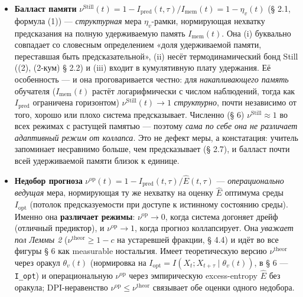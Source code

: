 \documentclass[pdflatex,sn-mathphys-ay]{sn-jnl}
\begin{document}
\begin{itemize}

\item

  \textbf{Балласт памяти} \(\nu^{\text{Still}}(t) = 1 - I_{\text{pred}}(t,\tau)/I_{\text{mem}}(t) = 1 - \eta_v(t)\) (§ 2.1, формула (1)) --- \emph{структурная} мера \(\eta_v\)-рамки, нормирующая нехватку предсказания на полную удерживаемую память \(I_{\text{mem}}(t)\). Она (i) буквально совпадает со словесным определением «доля удерживаемой памяти, переставшая быть предсказательной», (ii) несёт термодинамический бонд Still ((2), (2-кум) § 2.2) и (iii) входит в кумулятивную плату удержания. Её особенность --- и она проговаривается честно: для \emph{накапливающего память} обучателя (\(I_{\text{mem}}(t)\) растёт логарифмически с числом наблюдений, тогда как \(I_{\text{pred}}\) ограничена горизонтом) \(\nu^{\text{Still}}(t) \to 1\) \emph{структурно}, почти независимо от того, хорошо или плохо система предсказывает. Численно (§ 6) \(\nu^{\text{Still}} \approx 1\) во всех режимах с растущей памятью --- поэтому \emph{сама по себе она не различает адаптивный режим от коллапса}. Это не дефект меры, а констатация: учитель запоминает несравнимо больше, чем предсказывает (§ 2.7), и балласт почти всей удерживаемой памяти близок к единице.

\item

  \textbf{Недобор прогноза} \(\nu^{\text{op}}(t) = 1 - I_{\text{pred}}(t,\tau)/\hat E(t,\tau)\) --- \emph{операционально ведущая} мера, нормирующая ту же нехватку на оценку \(\hat E\) оптимума среды \(I_{\text{opt}}\) (потолок предсказуемости при доступе к истинному состоянию среды). Именно она \textbf{различает режимы}: \(\nu^{\text{op}} \to 0\), когда система догоняет дрейф (отличный предиктор), и \(\nu^{\text{op}} \to 1\), когда прогноз коллапсирует. Она \emph{уважает пол Леммы 2} (\(\nu^{\text{theor}} \ge 1 - c\) на устаревшей фракции, § 4.4) и идёт во все фигуры § 6 как measurable ностальгия. Имеет теоретическую версию \(\nu^{\text{theor}}\) через оракул \(\theta_v(t)\) (нормировка на \(I_{\text{opt}} = I(X_t; X_{t+\tau}\mid \theta_v(t))\), в § 6 --- \texttt{I\_opt}) и операциональную \(\nu^{\text{op}}\) через эмпирическую excess-entropy \(\hat E\) без оракула; DPI-неравенство \(\nu^{\text{op}} \le \nu^{\text{theor}}\) связывает обе оценки одного недобора.

\end{itemize}
\end{document}
